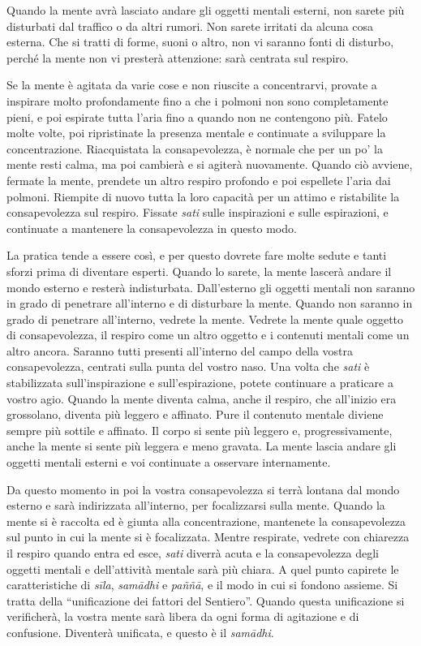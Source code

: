 Quando la mente avrà lasciato andare gli oggetti mentali esterni, non
sarete più disturbati dal traffico o da altri rumori. Non sarete
irritati da alcuna cosa esterna. Che si tratti di forme, suoni o altro,
non vi saranno fonti di disturbo, perché la mente non vi presterà
attenzione: sarà centrata sul respiro.

Se la mente è agitata da varie cose e non riuscite a concentrarvi,
provate a inspirare molto profondamente fino a che i polmoni non sono
completamente pieni, e poi espirate tutta l'aria fino a quando non ne
contengono più. Fatelo molte volte, poi ripristinate la presenza mentale
e continuate a sviluppare la concentrazione. Riacquistata la
consapevolezza, è normale che per un po' la mente resti calma, ma poi
cambierà e si agiterà nuovamente. Quando ciò avviene, fermate la mente,
prendete un altro respiro profondo e poi espellete l'aria dai polmoni.
Riempite di nuovo tutta la loro capacità per un attimo e ristabilite la
consapevolezza sul respiro. Fissate \emph{sati} sulle inspirazioni e
sulle espirazioni, e continuate a mantenere la consapevolezza in questo
modo.

La pratica tende a essere così, e per questo dovrete fare molte sedute e
tanti sforzi prima di diventare esperti. Quando lo sarete, la mente
lascerà andare il mondo esterno e resterà indisturbata. Dall'esterno gli
oggetti mentali non saranno in grado di penetrare all'interno e di
disturbare la mente. Quando non saranno in grado di penetrare
all'interno, vedrete la mente. Vedrete la mente quale oggetto di
consapevolezza, il respiro come un altro oggetto e i contenuti mentali
come un altro ancora. Saranno tutti presenti all'interno del campo della
vostra consapevolezza, centrati sulla punta del vostro naso. Una volta
che \emph{sati} è stabilizzata sull'inspirazione e sull'espirazione,
potete continuare a praticare a vostro agio. Quando la mente diventa
calma, anche il respiro, che all'inizio era grossolano, diventa più
leggero e affinato. Pure il contenuto mentale diviene sempre più sottile
e affinato. Il corpo si sente più leggero e, progressivamente, anche la
mente si sente più leggera e meno gravata. La mente lascia andare gli
oggetti mentali esterni e voi continuate a osservare internamente.

Da questo momento in poi la vostra consapevolezza si terrà lontana dal
mondo esterno e sarà indirizzata all'interno, per focalizzarsi sulla
mente. Quando la mente si è raccolta ed è giunta alla concentrazione,
mantenete la consapevolezza sul punto in cui la mente si è focalizzata.
Mentre respirate, vedrete con chiarezza il respiro quando entra ed esce,
\emph{sati} diverrà acuta e la consapevolezza degli oggetti mentali e
dell'attività mentale sarà più chiara. A quel punto capirete le
caratteristiche di \emph{sīla}, \emph{samādhi} e \emph{paññā}, e il modo
in cui si fondono assieme. Si tratta della ``unificazione dei fattori
del Sentiero''. Quando questa unificazione si verificherà, la vostra
mente sarà libera da ogni forma di agitazione e di confusione. Diventerà
unificata, e questo è il \emph{samādhi}.

